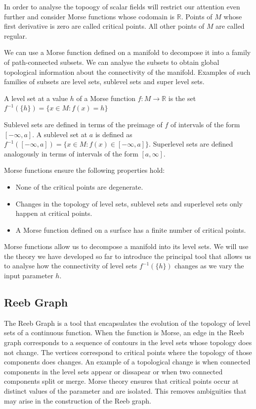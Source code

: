 In order to analyse the topoogy of scalar fields will restrict our attention even further and consider Morse functions whose codomain is $\mathbb{R}$. Points of $M$ whose first derivative is zero are called critical points. All other points of $M$ are called regular.

We can use a Morse function defined on a manifold to decompose it into a family of path-connected subsets. We can analyse the subsets to obtain global topological information about the connectivity of the manifold. Examples of such families of subsets are level sets, sublevel sets and super level sets.

\begin{defn} A level set at a value $h$ of a Morse function $f: M \to \mathbb{R}$ is the set $f^{-1}(\{h\}) = \{x \in M: f(x) = h \}$   \end{defn}

Sublevel sets are defined in terms of the preimage of $f$ of intervals of the form $[-\infty, a]$. A sublevel set at $a$ is defined as $f^{-1}([-\infty, a]) = \{x \in M: f(x) \in [-\infty, a] \}$. Superlevel sets are defined analogously in terms of intervals of the form $[a, \infty]$.

Morse functions ensure the following properties hold:

\begin{itemize}
    \item None of the critical points are degenerate.
    \item Changes in the topology of level sets, sublevel sets and superlevel sets only happen at critical points.
    \item A Morse function defined on a surface has a finite number of critical points.
\end{itemize}

Morse functions allow us to decompose a manifold into its level sets. We will use the theory we have developed so far to introduce the principal tool that allows us to analyse how the connectivity of level sets $f^{-1}(\{h\})$ changes as we vary the input parameter $h$.

\subsection{Reeb Graph}

The Reeb Graph is a tool that encapsulates the evolution of the topology of level sets of a continuous function. When the function is Morse, an edge in the Reeb graph corresponds to a sequence of contours in the level sets whose topology does not change. The vertices correspond to critical points where the topology of those components does changes. An example of a topological change is when connected components in the level sets appear or dissapear or when two connected components split or merge. Morse theory ensures that critical points occur at distinct values of the parameter and are isolated. This removes ambiguities that may arise in the construction of the Reeb graph.


